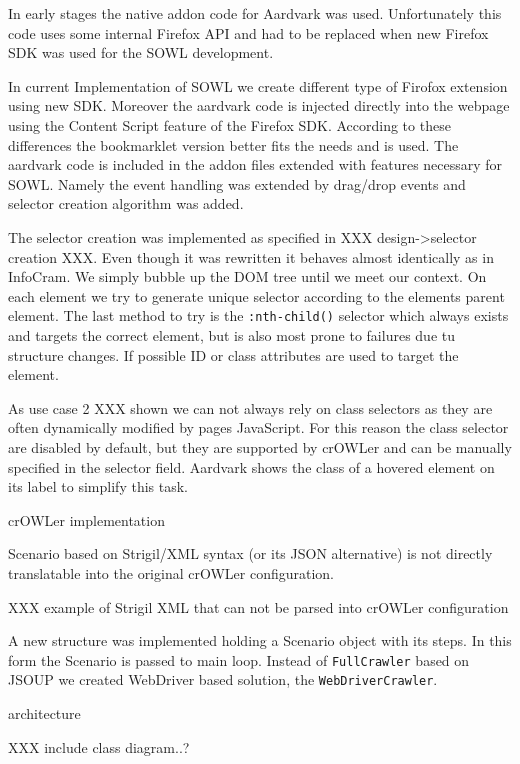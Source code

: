 In early stages the native addon code for Aardvark was used. Unfortunately this
code uses some internal Firefox API and had to be replaced when new Firefox SDK
was used for the SOWL development. 

In current Implementation of SOWL we create different type of Firofox extension
using new SDK. Moreover the aardvark code is injected directly into the webpage
using the Content Script feature of the Firefox SDK. According to these
differences the bookmarklet version better fits the needs and is used. The
aardvark code is included in the addon files extended with features necessary
for SOWL. Namely the event handling was extended by drag/drop events and 
selector creation algorithm was added. 

The selector creation was implemented as specified in XXX design->selector
creation XXX.  Even though it was rewritten it behaves almost identically as in
InfoCram. We simply bubble up the DOM tree until we meet our context. On each
element we try to generate unique selector according to the elements parent
element. The last method to try is the {\tt :nth-child()} selector which always
exists and targets the correct element, but is also most prone to failures due
tu structure changes. If possible ID or class attributes are used to target the
element. 

As use case 2 XXX shown we can not always rely on class selectors as they are 
often dynamically modified by pages JavaScript. For this reason the class
selector are disabled by default, but they are supported by crOWLer and can be
manually specified in the selector field. Aardvark shows the class of a hovered
element on its label to simplify this task. 


\sec crOWLer implementation

Scenario based on Strigil/XML syntax (or its JSON alternative) is not directly 
translatable into the original crOWLer configuration. 

XXX example of Strigil XML that can not be parsed into crOWLer configuration

A new structure was implemented holding a Scenario object with its steps.  In
this form the Scenario is passed to main loop. Instead of {\tt FullCrawler}
based on JSOUP we created WebDriver based solution, the {\tt WebDriverCrawler}. 


\secc architecture

XXX include class diagram..?


%


